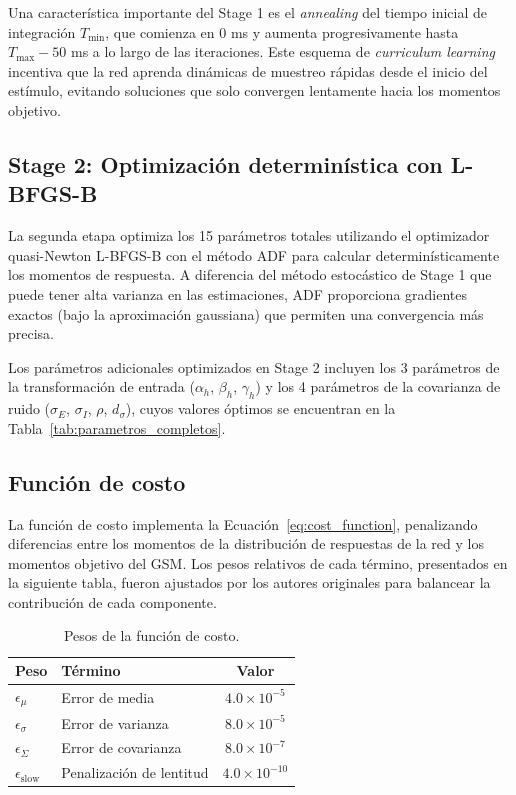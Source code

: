 Una característica importante del Stage 1 es el  \textit{annealing} del tiempo inicial de integración $T_{\min}$, que comienza en 0 ms y aumenta progresivamente hasta $T_{\max} - 50$ ms a lo largo de las iteraciones. Este esquema de  \textit{curriculum learning} incentiva que la red aprenda dinámicas de muestreo rápidas desde el inicio del estímulo, evitando soluciones que solo convergen lentamente hacia los momentos objetivo.

\subsection{Stage 2: Optimización determinística con L-BFGS-B}
\label{subsec:impl_stage2}

La segunda etapa optimiza los 15 parámetros totales utilizando el optimizador quasi-Newton \acrshort{L-BFGS-B} con el método \acrshort{ADF} para calcular determinísticamente los momentos de respuesta. A diferencia del método estocástico de Stage 1 que puede tener alta varianza en las estimaciones, \acrshort{ADF} proporciona gradientes exactos (bajo la aproximación gaussiana) que permiten una convergencia más precisa.

Los parámetros adicionales optimizados en Stage 2 incluyen los 3 parámetros de la transformación de entrada ($\alpha_h$, $\beta_h$, $\gamma_h$) y los 4 parámetros de la covarianza de ruido ($\sigma_E$, $\sigma_I$, $\rho$, $d_\sigma$), cuyos valores óptimos se encuentran en la Tabla~\ref{tab:parametros_completos}.

\subsection{Función de costo}
\label{subsec:impl_costo}

La función de costo implementa la Ecuación~\ref{eq:cost_function}, penalizando diferencias entre los momentos de la distribución de respuestas de la red y los momentos objetivo del \acrshort{GSM}. Los pesos relativos de cada término, presentados en la siguiente tabla, fueron ajustados por los autores originales para balancear la contribución de cada componente.

\begin{table}[H]
\centering
\caption{Pesos de la función de costo.}
\label{tab:cost_weights}
\begin{tabular}{llc}
\toprule
\textbf{Peso} & \textbf{Término} & \textbf{Valor} \\
\midrule
$\epsilon_\mu$ & Error de media & $4.0 \times 10^{-5}$ \\
$\epsilon_\sigma$ & Error de varianza & $8.0 \times 10^{-5}$ \\
$\epsilon_\Sigma$ & Error de covarianza & $8.0 \times 10^{-7}$ \\
$\epsilon_{\text{slow}}$ & Penalización de lentitud & $4.0 \times 10^{-10}$ \\
\bottomrule
\end{tabular}
\end{table}

